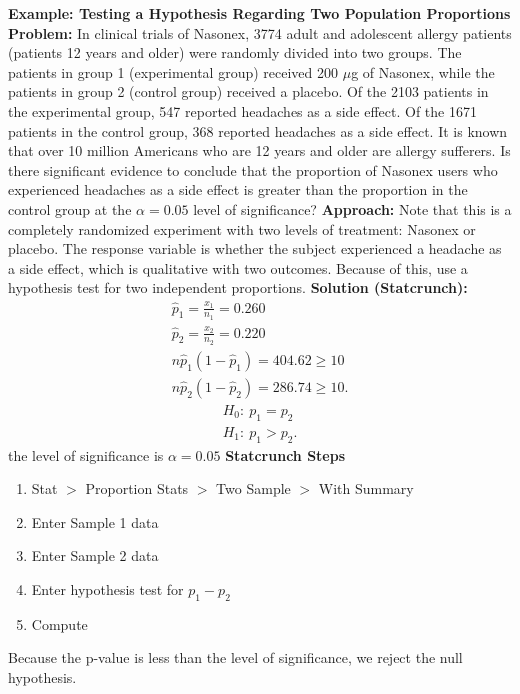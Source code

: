 \documentclass{report}
\begin{document}
    \pagebreak \bigbreak \noindent 
    \bigbreak \noindent 
    \begin{mdframed}
      \textbf{Example: Testing a Hypothesis Regarding Two Population Proportions}
      \bigbreak \noindent 
      \textbf{Problem:}
      In clinical trials of Nasonex\textsuperscript{\textregistered}, 3774 adult and adolescent allergy patients (patients 12 years and older) were randomly divided into two groups. The patients in group 1 (experimental group) received 200 $\mu$g of Nasonex, while the patients in group 2 (control group) received a placebo. Of the 2103 patients in the experimental group, 547 reported headaches as a side effect. Of the 1671 patients in the control group, 368 reported headaches as a side effect. It is known that over 10 million Americans who are 12 years and older are allergy sufferers. Is there significant evidence to conclude that the proportion of Nasonex users who experienced headaches as a side effect is greater than the proportion in the control group at the $\alpha=0.05$ level of significance?
      \bigbreak \noindent 
      \textbf{Approach:}
      Note that this is a completely randomized experiment with two levels of treatment: Nasonex or placebo. The response variable is whether the subject experienced a headache as a side effect, which is qualitative with two outcomes. Because of this, use a hypothesis test for two independent proportions.
      \bigbreak \noindent 
      \textbf{Solution (Statcrunch):}
      \begin{align*}
          \hat{p}_{1} = \frac{x_{1}}{n_{1}} = 0.260 \\
          \hat{p}_{2} = \frac{x_{2}}{n_{2}} = 0.220 \\
          n\hat{p}_{1}(1-\hat{p}_{1}) = 404.62 \geq 10 \\
          n\hat{p}_{2}(1-\hat{p}_{2}) = 286.74 \geq 10
      .\end{align*}
      \begin{align*}
          H_{0}:\ p_{1} = p_{2} \\
          H_{1}:\  p_{1} > p_{2}
      .\end{align*}
      the level of significance is $\alpha = 0.05 $
      \bigbreak \noindent 
      \textbf{Statcrunch Steps}
      \begin{enumerate}
          \item Stat $> $ Proportion Stats $> $ Two Sample $> $ With Summary
            \item Enter Sample 1 data
            \item Enter Sample 2 data
            \item Enter hypothesis test for $p_{1} - p_{2} $
            \item Compute
      \end{enumerate}
      Because the p-value is less than the level of significance, we reject the null hypothesis.

    \end{mdframed}
\end{document}
